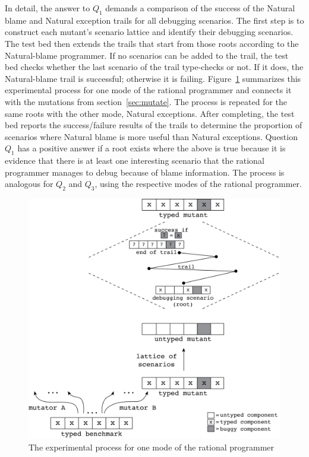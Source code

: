 
In detail, the answer to $Q_1$ demands a comparison of the success of the Natural
blame and Natural exception trails for all debugging scenarios.  The
first step is to construct each mutant's scenario lattice and identify their
debugging scenarios.  The test bed then extends the trails that start
from those roots according to the Natural-blame programmer.  If no scenarios can
be added to the trail, the test bed checks whether the last scenario
of the trail type-checks or not. If it does, the
Natural-blame trail is successful; otherwise it is failing. 
Figure~\ref{fig:process} summarizes this experimental process for
one mode of the rational programmer and connects it with the mutations from
section~\ref{sec:mutate}.
The process is repeated for the same roots with the other mode, Natural
exceptions.
After completing, the test bed
reports the success/failure results of the trails to determine the proportion of
scenarios where Natural blame is more useful than Natural exceptions.  Question
$Q_1$ has a positive answer if a root exists where the above is true because it
is evidence that there is at least one interesting scenario that the rational
programmer manages to debug because of blame information.  The process is analogous
for $Q_2$ and $Q_3$, using the respective modes of the rational programmer.

\begin{figure}[bh] \footnotesize
  \centering
  \includegraphics[scale=0.36]{./Images/process}
  \caption{The experimental process for one mode of the rational programmer}
  \label{fig:process}
\end{figure}


